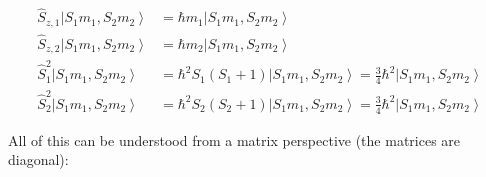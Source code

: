 \documentclass{article}
\begin{document}
\begin{enumerate}
\begin{enumerate}
{            $$
            \begin{aligned}
            \hat{S}_{z, 1}\left|S_{1} m_{1}, S_{2} m_{2}\right\rangle & = \hbar m_{1}\left|S_{1} m_{1}, S_{2} m_{2}\right\rangle \\
            \hat{S}_{z, 2}\left|S_{1} m_{1}, S_{2} m_{2}\right\rangle & = \hbar m_{2}\left|S_{1} m_{1}, S_{2} m_{2}\right\rangle \\
            \hat{S}_{1}^{2}\left|S_{1} m_{1}, S_{2} m_{2}\right\rangle & = \hbar^{2} S_{1}\left(S_{1} + 1\right)\left|S_{1} m_{1}, S_{2} m_{2}\right\rangle = \frac{3}{4} \hbar^{2}\left|S_{1} m_{1}, S_{2} m_{2}\right\rangle \\
            \hat{S}_{2}^{2}\left|S_{1} m_{1}, S_{2} m_{2}\right\rangle & = \hbar^{2} S_{2}\left(S_{2} + 1\right)\left|S_{1} m_{1}, S_{2} m_{2}\right\rangle = \frac{3}{4} \hbar^{2}\left|S_{1} m_{1}, S_{2} m_{2}\right\rangle
            \end{aligned}
            $$


All of this can be understood from a matrix perspective (the matrices are diagonal):

}
\end{enumerate}
\end{enumerate}
\end{document}
